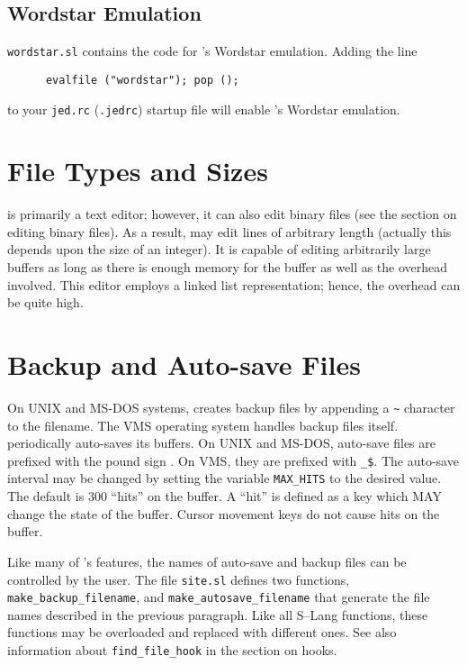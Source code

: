 \subsection{Wordstar Emulation}

  \verb|wordstar.sl| contains the \slang{} code for \jed{}'s Wordstar
  emulation. Adding the line
\begin{verbatim}
      evalfile ("wordstar"); pop ();
\end{verbatim}
  to your \verb|jed.rc| (\verb|.jedrc|) startup file will enable \jed{}'s
  Wordstar emulation.


\section{File Types and Sizes}

  \jed{} is primarily a text editor; however, it can also edit binary files
  (see the section on editing binary files).  As a result, \jed{} may edit
  lines of arbitrary length (actually this depends upon the size of an
  integer).  It is capable of editing arbitrarily large buffers as long as
  there is enough memory for the buffer as well as the overhead involved.
  This editor employs a linked list representation; hence, the overhead can
  be quite high.

\section{Backup and Auto-save Files}

  On UNIX and MS-DOS systems, \jed{} creates backup files by appending
  a \verb|~| character to the filename.  The VMS operating system
  handles backup files itself.  \jed{} periodically auto-saves its
  buffers.  On UNIX and MS-DOS, auto-save files are prefixed with the
  pound sign \var{\#}.  On VMS, they are prefixed with \verb|_$|.  %
  The auto-save interval may be changed by setting the variable
  \verb|MAX_HITS| to the desired value. The default is 300 ``hits'' on
  the buffer. A ``hit'' is defined as a key which MAY change the state
  of the buffer. Cursor movement keys do not cause hits on the buffer.

  Like many of \jed{}'s features, the names of auto-save and backup files can be
  controlled by the user.  The file \verb|site.sl| defines two functions,
  \verb|make_backup_filename|, and \verb|make_autosave_filename| that
  generate the file names described in the previous paragraph.  Like all
  S--Lang functions, these functions may be overloaded and replaced with
  different ones.  See also information about \verb|find_file_hook| in the
  section on hooks.

